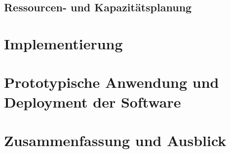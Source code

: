 \documentclass[a4paper,12pt,headsepline]{article}
\begin{document}
\subsection{Ressourcen- und Kapazitätsplanung}
\section{Implementierung}
\section{Prototypische Anwendung und Deployment der Software}
\section{Zusammenfassung und Ausblick}
\newpage

\setcounter{page}{3}


\newpage
\end{document}
